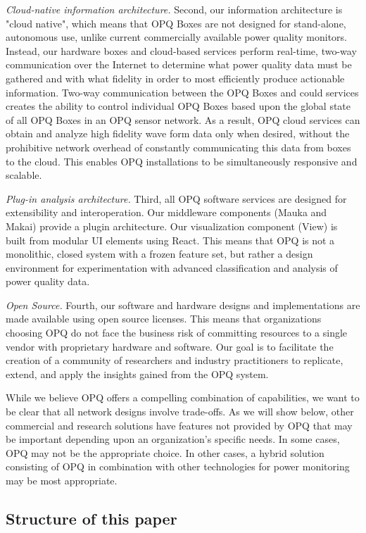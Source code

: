 {\em Cloud-native information architecture.} Second, our information architecture is "cloud native", which means that OPQ Boxes are not designed for stand-alone, autonomous use, unlike current commercially available power quality monitors. Instead, our hardware boxes and cloud-based services perform real-time, two-way communication over the Internet to determine what power quality data must be gathered and with what fidelity in order to most efficiently produce actionable information. Two-way communication between the OPQ Boxes and could services creates the ability to control individual OPQ Boxes based upon the global state of all OPQ Boxes in an OPQ sensor network. As a result, OPQ cloud services can obtain and analyze high fidelity wave form data only when desired, without the prohibitive network overhead of constantly communicating this data from boxes to the cloud. This enables OPQ installations to be simultaneously responsive and scalable.

{\em Plug-in analysis architecture.} Third, all OPQ software services are designed for extensibility and interoperation. Our middleware components (Mauka and Makai) provide a plugin architecture. Our visualization component (View) is built from modular UI elements using React.  This means that OPQ is not a monolithic, closed system with a frozen feature set, but rather a design environment for experimentation with advanced classification and analysis of power quality data.

{\em Open Source.} Fourth, our software and hardware designs and implementations are made available using open source licenses. This means that organizations choosing OPQ do not face the business risk of committing resources to a single vendor with proprietary hardware and software. Our goal is to facilitate the creation of a community of researchers and industry practitioners to replicate, extend, and apply the insights gained from the OPQ system.

While we believe OPQ offers a compelling combination of capabilities, we want to be clear that all network designs involve trade-offs. As we will show below, other commercial and research solutions have features not provided by OPQ that may be important depending upon an organization's specific needs. In some cases, OPQ may not be the appropriate choice. In other cases, a hybrid solution consisting of OPQ in combination with other technologies for power monitoring may be most appropriate.

\subsection{Structure of this paper}


